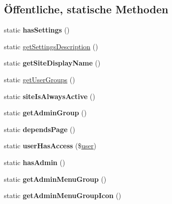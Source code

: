 \subsection*{Öffentliche, statische Methoden}
\begin{DoxyCompactItemize}
\item 
\mbox{\label{classabsenzenschueler_a1f3b2d9a08fd2516f532a79a40dd70cf}} 
static {\bfseries has\+Settings} ()
\item 
static \mbox{\hyperlink{classabsenzenschueler_a6936ce72f42d0d3e3a0d282dab0d4d81}{get\+Settings\+Description}} ()
\item 
\mbox{\label{classabsenzenschueler_abdd0e3942c6675a38f6da8874ba8442e}} 
static {\bfseries get\+Site\+Display\+Name} ()
\item 
static \mbox{\hyperlink{classabsenzenschueler_a252619a587fb18bcd1ade0d2bd9a0c3e}{get\+User\+Groups}} ()
\item 
\mbox{\label{classabsenzenschueler_a42966f28ba926af720c28c45c3dff985}} 
static {\bfseries site\+Is\+Always\+Active} ()
\item 
\mbox{\label{classabsenzenschueler_a24edce0aff4b0bd6d7709b30748b0875}} 
static {\bfseries get\+Admin\+Group} ()
\item 
\mbox{\label{classabsenzenschueler_ada3ceeaca67d8af39d01521bb87e6f8e}} 
static {\bfseries depends\+Page} ()
\item 
\mbox{\label{classabsenzenschueler_add393953cc26725670b05971cc401d2a}} 
static {\bfseries user\+Has\+Access} (\$\mbox{\hyperlink{classuser}{user}})
\item 
\mbox{\label{classabsenzenschueler_a533935265f0876f3e69daa0d7d881867}} 
static {\bfseries has\+Admin} ()
\item 
\mbox{\label{classabsenzenschueler_a985ad33bf81ec47c1b7b08eb238f9a5c}} 
static {\bfseries get\+Admin\+Menu\+Group} ()
\item 
\mbox{\label{classabsenzenschueler_aa2599eb7f7766f8d084ec478c30b95d4}} 
static {\bfseries get\+Admin\+Menu\+Group\+Icon} ()
\end{DoxyCompactItemize}
